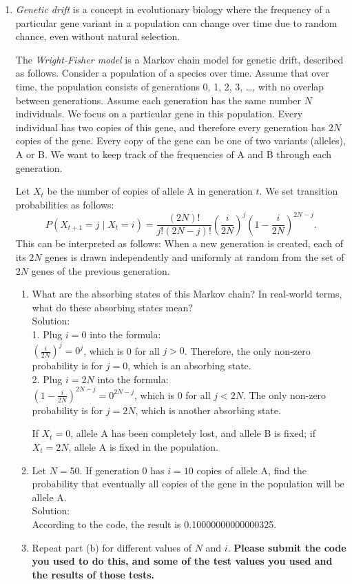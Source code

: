 \documentclass[oneside,12pt]{memoir}
\begin{document}
\begin{enumerate}[leftmargin=*]
\item \emph{Genetic drift} is a concept in evolutionary biology where the frequency of a particular gene variant in a population can change over time due to random chance, even without natural selection.

	The \emph{Wright-Fisher model} is a Markov chain model for genetic drift, described as follows. Consider a population of a species over time. Assume that over time, the population consists of generations 0, 1, 2, 3, \dots, with no overlap between generations. Assume each generation has the same number $N$ individuals. We focus on a particular gene in this population. Every individual has two copies of this gene, and therefore every generation has $2N$ copies of the gene. Every copy of the gene can be one of two variants (alleles), A or B. We want to keep track of the frequencies of A and B through each generation.
	
		Let $X_t$ be the number of copies of allele A in generation $t$. We set transition probabilities as follows:
		\[
		P(X_{t+1} = j \mid X_t = i) = \frac{(2N)!}{j!(2N-j)!} \left( \frac{i}{2N} \right)^j \left( 1 - \frac{i}{2N} \right)^{2N-j}.
		\]
		This can be interpreted as follows: When a new generation is created, each of its $2N$ genes is drawn independently and uniformly at random from the set of $2N$ genes of the previous generation.
		
	\begin{enumerate}
		\item What are the absorbing states of this Markov chain? In real-world terms, what do these absorbing states mean?\\
            Solution: \\
            1. Plug \( i = 0 \) into the formula:\\
            \( \left( \frac{i}{2N} \right)^j = 0^j \), which is 0 for all \( j > 0 \). Therefore, the only non-zero probability is for \( j = 0 \), which is an absorbing state.\\
            2. Plug \( i = 2N \) into the formula:\\
            \( \left( 1 - \frac{i}{2N} \right)^{2N - j} = 0^{2N - j} \), which is 0 for all \( j < 2N \). The only non-zero probability is for \( j = 2N \), which is another absorbing state. 

            If \(X_t = 0\), allele A has been completely lost, and allele B is fixed; if \(X_t = 2N\), allele A is fixed in the population.

		\item Let $N = 50$. If generation 0 has $i = 10$ copies of allele A, find the probability that eventually all copies of the gene in the population will be allele A.\\
            Solution:\\
            According to the code, the result is 0.10000000000000325.\\    
		\item Repeat part (b) for different values of $N$ and $i$. \textbf{Please submit the code you used to do this, and some of the test values you used and the results of those tests.}
		

\end{enumerate}
\end{enumerate}
\end{document}
